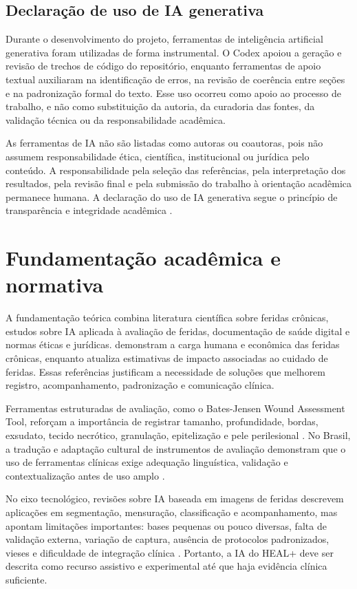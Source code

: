 \documentclass[
    12pt,
    oneside,
    a4paper,
    chapter=TITLE,
    brazil,
    sumario=tradicional,
    hidelinks
]{abntex2}
\begin{document}
\section{Declaração de uso de IA generativa}

Durante o desenvolvimento do projeto, ferramentas de inteligência artificial generativa foram utilizadas de forma instrumental. O Codex apoiou a geração e revisão de trechos de código do repositório, enquanto ferramentas de apoio textual auxiliaram na identificação de erros, na revisão de coerência entre seções e na padronização formal do texto. Esse uso ocorreu como apoio ao processo de trabalho, e não como substituição da autoria, da curadoria das fontes, da validação técnica ou da responsabilidade acadêmica.

As ferramentas de IA não são listadas como autoras ou coautoras, pois não assumem responsabilidade ética, científica, institucional ou jurídica pelo conteúdo. A responsabilidade pela seleção das referências, pela interpretação dos resultados, pela revisão final e pela submissão do trabalho à orientação acadêmica permanece humana. A declaração do uso de IA generativa segue o princípio de transparência e integridade acadêmica \cite{cnpq2026}.

\chapter{Fundamentação acadêmica e normativa}

A fundamentação teórica combina literatura científica sobre feridas crônicas, estudos sobre IA aplicada à avaliação de feridas, documentação de saúde digital e normas éticas e jurídicas.  demonstram a carga humana e econômica das feridas crônicas, enquanto  atualiza estimativas de impacto associadas ao cuidado de feridas. Essas referências justificam a necessidade de soluções que melhorem registro, acompanhamento, padronização e comunicação clínica.

Ferramentas estruturadas de avaliação, como o Bates-Jensen Wound Assessment Tool, reforçam a importância de registrar tamanho, profundidade, bordas, exsudato, tecido necrótico, granulação, epitelização e pele perilesional \cite{batesjensen2019}. No Brasil, a tradução e adaptação cultural de instrumentos de avaliação demonstram que o uso de ferramentas clínicas exige adequação linguística, validação e contextualização antes de uso amplo \cite{alves2015}.

No eixo tecnológico, revisões sobre IA baseada em imagens de feridas descrevem aplicações em segmentação, mensuração, classificação e acompanhamento, mas apontam limitações importantes: bases pequenas ou pouco diversas, falta de validação externa, variação de captura, ausência de protocolos padronizados, vieses e dificuldade de integração clínica \cite{anisuzzaman2022,dabas2023}. Portanto, a IA do HEAL+ deve ser descrita como recurso assistivo e experimental até que haja evidência clínica suficiente.
\end{document}
